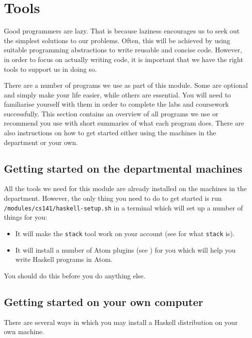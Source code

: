 \chapter{Tools}
\label{ch:tools}

Good programmers are lazy. That is because laziness encourages us to seek out the simplest solutions to our problems. Often, this will be achieved by using suitable programming abstractions to write reusable and concise code. However, in order to focus on actually writing code, it is important that we have the right tools to support us in doing so. 

There are a number of programs we use as part of this module. Some are optional and simply make your life easier, while others are essential. You will need to familiarise yourself with them in order to complete the labs and coursework successfully. This section contains an overview of all programs we use or recommend you use with short summaries of what each program does. There are also instructions on how to get started either using the machines in the department or your own.

\section{Getting started on the departmental machines}
\label{sec:department-setup}

All the tools we need for this module are already installed on the machines in the department. However, the only thing you need to do to get started is run \texttt{\small /modules/cs141/haskell-setup.sh} in a terminal which will set up a number of things for you:
\begin{itemize}
	\item It will make the \texttt{\small stack} tool work on your account (see  for what \texttt{\small stack} is).
	\item It will install a number of Atom plugins (see ) for you which will help you write Haskell programs in Atom. 
\end{itemize}
You should do this before you do anything else.

\section{Getting started on your own computer}
\label{sec:home-setup}

There are several ways in which you may install a Haskell distribution on your own machine.


